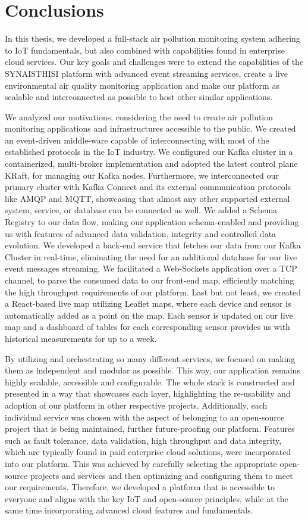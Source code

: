 \chapter{Conclusions}
\label{chap6}
In this thesis, we developed a full-stack air pollution monitoring system adhering to IoT fundamentals, but also combined with capabilities found in enterprise cloud services. Our key goals and challenges were to extend the capabilities of the SYNAISTHISI platform with advanced event streaming services, create a live environmental air quality monitoring application and make our platform as scalable and interconnected as possible to host other similar applications.

We analyzed our motivations, considering the need to create air pollution monitoring applications and infrastructures accessible to the public. We created an event-driven middle-ware capable of interconnecting with most of the established protocols in the IoT industry. We configured our Kafka cluster in a containerized, multi-broker implementation and adopted the latest control plane KRaft, for managing our Kafka nodes. Furthermore, we interconnected our primary cluster with Kafka Connect and its external communication protocols like AMQP and MQTT, showcasing that almost any other supported external system, service, or database can be connected as well. We added a Schema Registry to our data flow, making our application schema-enabled and providing us with features of advanced data validation, integrity and controlled data evolution. We developed a back-end service that fetches our data from our Kafka Cluster in real-time, eliminating the need for an additional database for our live event messages streaming. We facilitated a Web-Sockets application over a TCP channel, to parse the consumed data to our front-end map, efficiently matching the high throughput requirements of our platform. Last but not least, we created a React-based live map utilizing Leaflet maps, where each device and sensor is automatically added as a point on the map. Each sensor is updated on our live map and a dashboard of tables for each corresponding sensor provides us with historical measurements for up to a week.

By utilizing and orchestrating so many different services, we focused on making them as independent and modular as possible. This way, our application remains highly scalable, accessible and configurable. The whole stack is constructed and presented in a way that showcases each layer, highlighting the re-usability and adoption of our platform in other respective projects. Additionally, each individual service was chosen with the aspect of belonging to an open-source project that is being maintained, further future-proofing our platform. Features such as fault tolerance, data validation, high throughput and data integrity, which are typically found in paid enterprise cloud solutions, were incorporated into our platform. This was achieved by carefully selecting the appropriate open-source projects and services and then optimizing and configuring them to meet our requirements. Therefore, we developed a platform that is accessible to everyone and aligns with the key IoT and open-source principles, while at the same time incorporating advanced cloud features and fundamentals.

